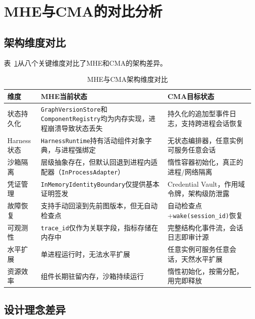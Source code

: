 \documentclass[12pt,a4paper]{ctexart}
\begin{document}
\section{MHE与CMA的对比分析}\label{sec:compare}

\subsection{架构维度对比}

表~\ref{tab:compare}从八个关键维度对比了MHE和CMA的架构差异。

\begin{table}[H]
\centering
\caption{MHE与CMA架构维度对比}\label{tab:compare}
\begin{tabular}{@{}p{3cm}p{5.5cm}p{5.5cm}@{}}
\toprule
\textbf{维度} & \textbf{MHE当前状态} & \textbf{CMA目标状态} \\
\midrule
状态持久化 & \texttt{GraphVersionStore}和\texttt{ComponentRegistry}均为内存实现，进程崩溃导致状态丢失 & 持久化的追加型事件日志，支持跨进程会话恢复 \\
\addlinespace
Harness状态 & \texttt{HarnessRuntime}持有活动组件对象字典，与进程强绑定 & 无状态编排器，任意实例可服务任意会话 \\
\addlinespace
沙箱隔离 & 层级抽象存在，但默认回退到进程内适配器（\texttt{InProcessAdapter}） & 惰性容器初始化，真正的进程/网络隔离 \\
\addlinespace
凭证管理 & \texttt{InMemoryIdentityBoundary}仅提供基本证明签发 & Credential Vault，作用域令牌，架构级防泄露 \\
\addlinespace
故障恢复 & 支持手动回滚到先前图版本，但无自动检查点 & 自动检查点+\texttt{wake(session\_id)}恢复 \\
\addlinespace
可观测性 & \texttt{trace\_id}仅作为关联字段，指标存储在内存中 & 完整结构化事件流，会话日志即审计源 \\
\addlinespace
水平扩展 & 单进程运行时，无法水平扩展 & 任意实例可服务任意会话，天然水平扩展 \\
\addlinespace
资源效率 & 组件长期驻留内存，沙箱持续运行 & 惰性初始化，按需分配，用完即释放 \\
\bottomrule
\end{tabular}
\end{table}

\subsection{设计理念差异}
\end{document}
